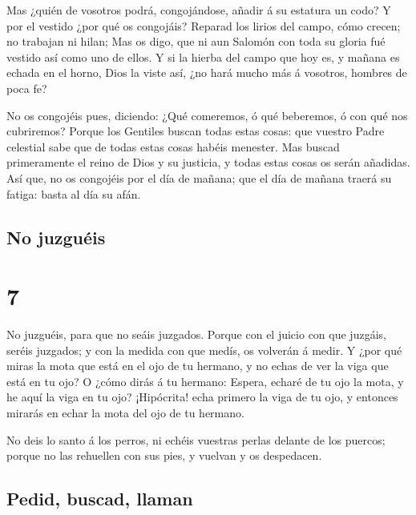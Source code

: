  Mas ¿quién de vosotros podrá, congojándose, añadir á su
estatura un codo?  Y por el vestido ¿por qué os
congojáis? Reparad los lirios del campo, cómo crecen; no trabajan ni
hilan;  Mas os digo, que ni aun Salomón con toda su
gloria fué vestido así como uno de ellos.  Y si la hierba
del campo que hoy es, y mañana es echada en el horno, Dios la viste así,
¿no hará mucho más á vosotros, hombres de poca fe?

 No os congojéis pues, diciendo: ¿Qué comeremos, ó qué
beberemos, ó con qué nos cubriremos?  Porque los Gentiles
buscan todas estas cosas: que vuestro Padre celestial sabe que de todas
estas cosas habéis menester.  Mas buscad primeramente el
reino de Dios y su justicia, y todas estas cosas os serán añadidas.
 Así que, no os congojéis por el día de mañana; que el
día de mañana traerá su fatiga: basta al día su afán.

\hypertarget{no-juzguuxe9is}{%
\subsection{No juzguéis}\label{no-juzguuxe9is}}

\hypertarget{section-40-7}{%
\section{7}\label{section-40-7}}

 No juzguéis, para que no seáis juzgados. 
Porque con el juicio con que juzgáis, seréis juzgados; y con la medida
con que medís, os volverán á medir.  Y ¿por qué miras la
mota que está en el ojo de tu hermano, y no echas de ver la viga que
está en tu ojo?  O ¿cómo dirás á tu hermano: Espera,
echaré de tu ojo la mota, y he aquí la viga en tu ojo? 
¡Hipócrita! echa primero la viga de tu ojo, y entonces mirarás en echar
la mota del ojo de tu hermano.

 No deis lo santo á los perros, ni echéis vuestras perlas
delante de los puercos; porque no las rehuellen con sus pies, y vuelvan
y os despedacen.

\hypertarget{pedid-buscad-llaman}{%
\subsection{Pedid, buscad, llaman}\label{pedid-buscad-llaman}}

